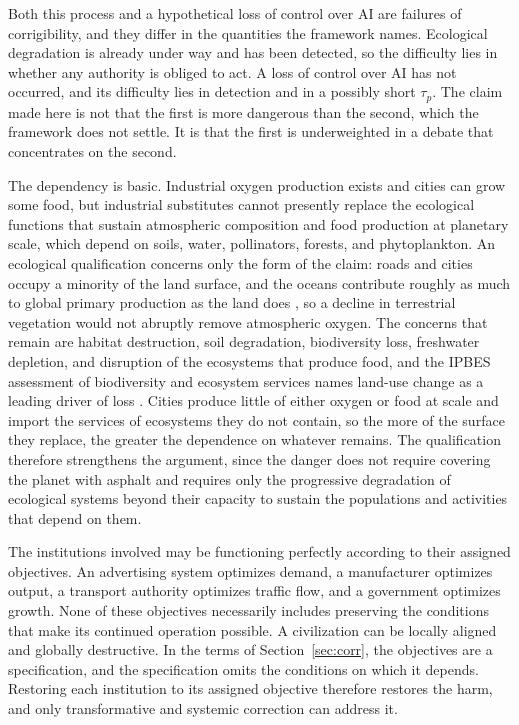 \documentclass[11pt]{article}
\begin{document}
Both this process and a hypothetical loss of control over AI are failures of corrigibility, and they differ in the quantities the framework names. Ecological degradation is already under way and has been detected, so the difficulty lies in whether any authority is obliged to act. A loss of control over AI has not occurred, and its difficulty lies in detection and in a possibly short $\tau_p$. The claim made here is not that the first is more dangerous than the second, which the framework does not settle. It is that the first is underweighted in a debate that concentrates on the second.

The dependency is basic. Industrial oxygen production exists and cities can grow some food, but industrial substitutes cannot presently replace the ecological functions that sustain atmospheric composition and food production at planetary scale, which depend on soils, water, pollinators, forests, and phytoplankton. An ecological qualification concerns only the form of the claim: roads and cities occupy a minority of the land surface, and the oceans contribute roughly as much to global primary production as the land does \cite{field1998}, so a decline in terrestrial vegetation would not abruptly remove atmospheric oxygen. The concerns that remain are habitat destruction, soil degradation, biodiversity loss, freshwater depletion, and disruption of the ecosystems that produce food, and the IPBES assessment of biodiversity and ecosystem services names land-use change as a leading driver of loss \cite{ipbes2019}. Cities produce little of either oxygen or food at scale and import the services of ecosystems they do not contain, so the more of the surface they replace, the greater the dependence on whatever remains. The qualification therefore strengthens the argument, since the danger does not require covering the planet with asphalt and requires only the progressive degradation of ecological systems beyond their capacity to sustain the populations and activities that depend on them.

The institutions involved may be functioning perfectly according to their assigned objectives. An advertising system optimizes demand, a manufacturer optimizes output, a transport authority optimizes traffic flow, and a government optimizes growth. None of these objectives necessarily includes preserving the conditions that make its continued operation possible. A civilization can be locally aligned and globally destructive. In the terms of Section~\ref{sec:corr}, the objectives are a specification, and the specification omits the conditions on which it depends. Restoring each institution to its assigned objective therefore restores the harm, and only transformative and systemic correction can address it.
\end{document}
